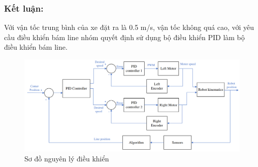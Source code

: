                 \subsubsection{Kết luận:} 
                \hspace{0.6cm}Với vận tốc trung bình của xe đặt ra là 0.5 m/s, vận tốc không quá cao, với yêu cầu điều khiển bám line nhóm quyết định sử dụng bộ điều khiển PID làm bộ điều khiển bám line.
                \begin{figure}[H]
                    \centering
                    \includegraphics[width=1\textwidth]{pictures/chapter2/chapter2_pic_14.png}
                    \caption{Sơ đồ nguyên lý điều khiển}
                    \label{control_principle}
                \end{figure}
                
